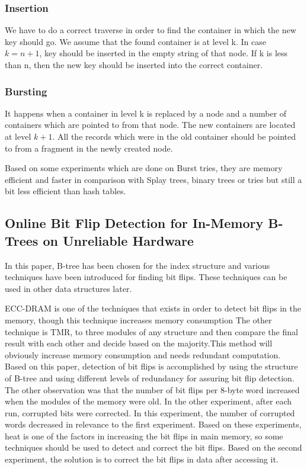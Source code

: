 \documentclass{report}
\begin{document}
\subsubsection{Insertion}

We have to do a correct traverse in order to find the container in which the new key should go. We assume that the found container is at level k. In case $k=n+1$, key should be inserted in the empty string of that node. If k is less than n, then the new key should be inserted into the correct container.

\subsubsection{Bursting}

It happens when a container in level k is replaced by a node and a number of containers which are pointed to from that node. The new containers are located at level $k+1$. All the records which were in the old container should be pointed to from a fragment in the newly created node. 

Based on some experiments which are done on Burst tries, they are memory efficient and faster in comparison with Splay trees, binary trees or tries but still a bit less efficient than hash tables.    


\subsection{Online Bit Flip Detection for In-Memory B-Trees on Unreliable Hardware \cite{kolditz} }

In this paper, B-tree has been chosen for the index structure and various techniques have been introduced for finding bit flips. These techniques can be used in other data structures later.

ECC-DRAM is one of the techniques that exists in order to detect bit flips in the memory, though this technique increases memory consumption The other technique is TMR, to three modules of any structure and then compare the final result with each other and decide based on the majority.This method will obviously increase memory consumption and needs redundant computation. Based on this paper, detection of bit flips is accomplished by using the structure of B-tree and using different levels of redundancy for assuring bit flip detection. The other observation was that the number of bit flips per 8-byte word increased when the modules of the memory were old. In the other experiment, after each run, corrupted bits were corrected. In this experiment, the number of corrupted words decreased in relevance to the first experiment. Based on these experiments, heat is one of the factors in increasing the bit flips in main memory, so some techniques should be used to detect and correct the bit flips. Based on the second experiment, the solution is to correct the bit flips in data after accessing it.
\end{document}
